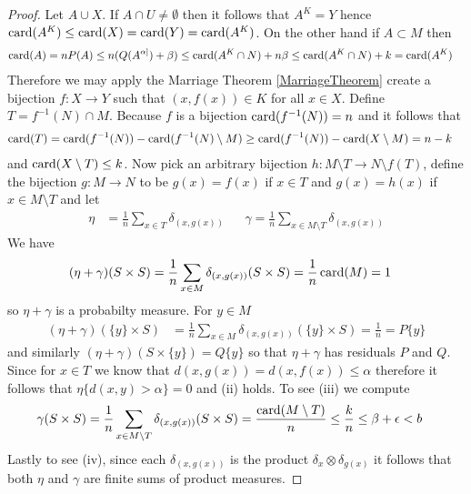 \begin{proof}
Let $A \cup X$.  If $A \cap U \neq \emptyset$ then it follows that $A^K = Y$ hence $\operatorname*{card}(A^K) \leq \operatorname*{card}(X) = \operatorname*{card}(Y) = \operatorname*{card}(A^K)$.  On the other hand if
$A \subset M$ then 
\begin{align*}
\operatorname*{card}(A) &= n P(A) \leq n (Q(A^{\alpha]}) + \beta) \leq \operatorname*{card}(A^K \cap N) + n \beta \leq \operatorname*{card}(A^K \cap N) + k = \operatorname*{card}(A^K)
\end{align*}
Therefore we may apply the Marriage Theorem \ref{MarriageTheorem} create a bijection $f : X \to Y$ such that $(x,f(x)) \in K$ for all $x \in X$.  Define $T = f^{-1}(N) \cap M$.  Because $f$ is a bijection $\operatorname*{card}(f^{-1}(N)) = n$ and it follows that 
\begin{align*}
\operatorname*{card}(T) &= \operatorname*{card}(f^{-1}(N)) - \operatorname*{card}(f^{-1}(N) \setminus M) \geq \operatorname*{card}(f^{-1}(N)) - \operatorname*{card}(X\setminus M) = n - k
\end{align*}
and $\operatorname*{card}(X \setminus T) \leq k$.  Now pick an arbitrary bijection $h : M \setminus T \to N \setminus f(T)$, define the bijection $g : M \to N$ to be $g(x) = f(x)$ if $x \in T$ and $g(x) = h(x)$ if $x \in M \setminus T$ and let
\begin{align*}
\eta &= \frac{1}{n} \sum_{x \in T} \delta_{(x,g(x))} &&\gamma =  \frac{1}{n} \sum_{x \in M \setminus T} \delta_{(x,g(x))}
\end{align*}
We have
\begin{align*}
(\eta + \gamma)(S \times S) &=  \frac{1}{n} \sum_{x \in M} \delta_{(x,g(x))} (S \times S) 
= \frac{1}{n} \operatorname*{card}(M) = 1
\end{align*}
so $\eta + \gamma$ is a probabilty measure.  For $y \in M$
\begin{align*}
(\eta + \gamma)(\lbrace y \rbrace \times S) 
&= \frac{1}{n} \sum_{x \in M} \delta_{(x,g(x))} (\lbrace y \rbrace \times S) = \frac{1}{n} = P\lbrace y \rbrace
\end{align*}
and similarly $(\eta + \gamma)(S \times \lbrace y \rbrace) = Q \lbrace y \rbrace$ so that $\eta +\gamma$ has residuals $P$ and $Q$.  Since for $x \in T$ we know that $d(x,g(x)) = d(x,f(x)) \leq \alpha$ therefore it follows that $\eta \lbrace d(x,y) > \alpha \rbrace = 0$ and (ii) holds.  To see (iii) we compute
\begin{align*}
\gamma(S \times S) &= \frac{1}{n} \sum_{x \in M \setminus T} \delta_{(x,g(x))}(S \times S) = \frac{\operatorname*{card}(M \setminus T)}{n} \leq \frac{k}{n} \leq \beta + \epsilon < b
\end{align*}
Lastly to see (iv), since each $\delta_{(x,g(x))}$ is the product $\delta_{x} \otimes \delta_{g(x)}$ it follows that both $\eta$ and $\gamma$ are finite sums of product measures. 


\end{proof}
